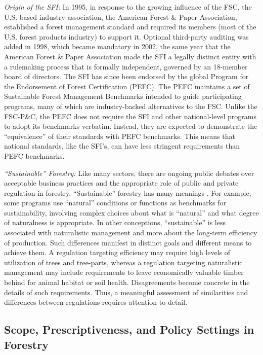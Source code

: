 \documentclass[
      12pt,
            Review ]{article}
\begin{document}
\emph{Origin of the SFI:} In 1995, in response to the growing influence of the FSC, the U.S.-based industry association, the American Forest \& Paper Association, established a forest management standard and required its members (most of the U.S. forest products industry) to support it. Optional third-party auditing was added in 1998, which became mandatory in 2002, the same year that the American Forest \& Paper Association made the SFI a legally distinct entity with a rulemaking process that is formally independent, governed by an 18-member board of directors. The SFI has since been endorsed by the global Program for the Endorsement of Forest Certification (PEFC). The PEFC maintains a set of Sustainable Forest Management Benchmarks intended to guide participating programs, many of which are industry-backed alternatives to the FSC. Unlike the FSC-P\&C, the PEFC does not require the SFI and other national-level programs to adopt its benchmarks verbatim. Instead, they are expected to demonstrate the ``equivalence'' of their standards with PEFC benchmarks. This means that national standards, like the SFI's, can have less stringent requirements than PEFC benchmarks.

\emph{``Sustainable'' Forestry:} Like many sectors, there are ongoing public debates over acceptable business practices and the appropriate role of public and private regulation in forestry. ``Sustainable'' forestry has many meanings \citep{McDermott2012}. For example, some programs use ``natural'' conditions or functions as benchmarks for sustainability, involving complex choices about what is ``natural'' and what degree of naturalness is appropriate. In other conceptions, ``sustainable'' is less associated with naturalistic management and more about the long-term efficiency of production. Such differences manifest in distinct goals and different means to achieve them. A regulation targeting efficiency may require high levels of utilization of trees and tree-parts, whereas a regulation targeting naturalistic management may include requirements to leave economically valuable timber behind for animal habitat or soil health. Disagreements become concrete in the details of such requirements. Thus, a meaningful assessment of similarities and differences between regulations requires attention to detail.

\hypertarget{scope-prescriptiveness-and-policy-settings-in-forestry}{%
\subsection{Scope, Prescriptiveness, and Policy Settings in Forestry}\label{scope-prescriptiveness-and-policy-settings-in-forestry}}
\end{document}
